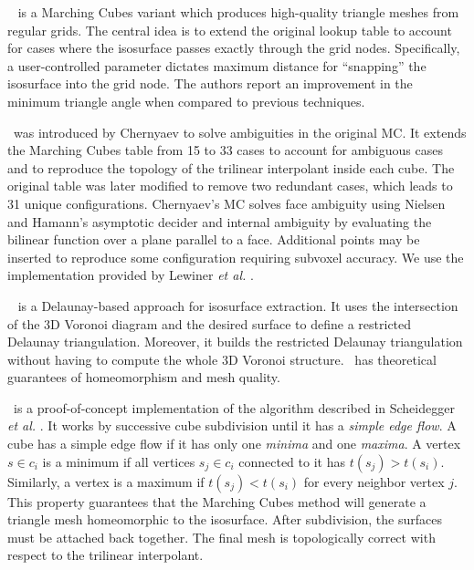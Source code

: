 \snapmc\ \cite{Raman:2008:QIM} is a Marching Cubes variant which produces high-quality 
triangle meshes from regular grids. The central idea is to extend the 
original lookup table to account for cases where the isosurface passes exactly through the 
grid nodes. Specifically, a user-controlled parameter dictates maximum distance 
for ``snapping'' the isosurface into the grid node. 
The authors report an improvement in the minimum triangle angle when compared to previous techniques.


\mclewiner\ was introduced by Chernyaev
\cite{Chernyaev95marchingcubes} to solve ambiguities in the original MC. It
extends the Marching Cubes table from 15 to 33 cases to account for ambiguous cases
and to reproduce the topology of the trilinear interpolant inside each cube. The
original table was later modified to remove two redundant cases, which leads to 31
unique configurations. Chernyaev's MC solves face ambiguity using Nielsen and
Hamann's \cite{Nielson:1991:ADR:949607.949621} asymptotic decider and internal ambiguity
by evaluating the bilinear function over a plane parallel to a face. Additional
points may be inserted to reproduce some configuration requiring subvoxel
accuracy.  We use the implementation provided by Lewiner \emph{et al.} \cite{Lewiner:2003}.

\deliso\ \cite{Dey07} is a Delaunay-based approach for isosurface extraction. 
It uses the intersection of the 3D Voronoi diagram and the desired surface to 
define a restricted Delaunay triangulation. Moreover, it
builds the restricted Delaunay triangulation without having to
compute the whole 3D Voronoi structure. \deliso\ has theoretical guarantees of
homeomorphism and mesh quality.

\mcsimpleflow\ is a proof-of-concept implementation of the algorithm
described in Scheidegger \emph{et al.}
\cite{scheidegger:techreport:2010}. It works by successive cube
subdivision until it has a \emph{simple edge flow}. A cube has a
simple edge flow if it has only one \emph{minima} and one
\emph{maxima}. A vertex $s \in c_i$ is a minimum if all vertices $s_j
\in c_i$ connected to it has $t(s_j) > t(s_i)$. Similarly, a vertex is
a maximum if $t(s_j) < t(s_i)$ for every neighbor vertex $j$.  This
property guarantees that the Marching Cubes method will generate a
triangle mesh homeomorphic to the isosurface. After subdivision, the
surfaces must be attached back together. The final mesh is
topologically correct with respect to the trilinear interpolant.

